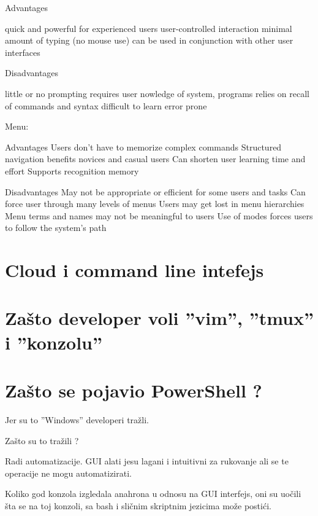 \documentclass[times, utf8, seminar]{fit}
\begin{document}

Advantages

quick and powerful for experienced users
user-controlled interaction
minimal amount of typing (no mouse use)
can be used in conjunction with other user interfaces

Disadvantages

little or no prompting
requires user nowledge of system, programs
relies on recall of commands and syntax
difficult to learn
error prone  


Menu:

Advantages
Users don't have to memorize complex commands
Structured navigation benefits novices and casual users
Can shorten user learning time and effort
Supports recognition memory


Disadvantages
 May not be appropriate or efficient for some users and tasks
Can force user through many levels of menus
Users may get lost in menu hierarchies
Menu terms and names may not be meaningful to users
Use of modes forces users to follow the system's path



\section{Cloud i command line intefejs}




\section{Zašto developer voli ''vim'', ''tmux'' i ''konzolu''}

\section{Zašto se pojavio PowerShell ?}

Jer su to ''Windows'' developeri tražli.

Zašto su to tražili ?

Radi automatizacije. GUI alati jesu lagani i intuitivni za rukovanje ali se te operacije ne mogu automatizirati.

Koliko god konzola izgledala anahrona u odnosu na GUI interfejs, oni su uočili šta se na toj konzoli, sa bash i sličnim skriptnim jezicima može postići.
\end{document}
